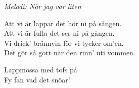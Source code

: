 {\footnotesize\textit{Melodi: När jag var liten}}\par
\vspace{10pt}
Att vi är lappar det hör ni på sången.\\
Att vi är fulla det ser ni på gången.\\
Vi drick' brännvin för vi tycker om'en.\\
Det gör så gott när den rinn' uti vommen.\par
\vspace{10pt}
Lappmössa med tofs på\\
Fy fan vad det snöar!
